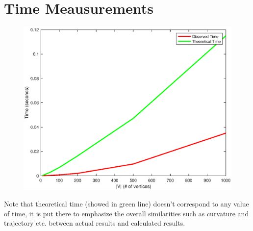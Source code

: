 \documentclass[twocolumns]{IEEEtran}
\begin{document}
	\section{Time Meausurements}
	\begin{figure}[h]
		\centering
		\includegraphics[scale=.4]{matlab/time_2.eps}
	\end{figure}
	Note that theoretical time (showed in green line) doesn't correspond to any value of time, it is put there to emphasize the overall similarities such as curvature and trajectory etc. between actual results and calculated results.

	
	
\end{document}
